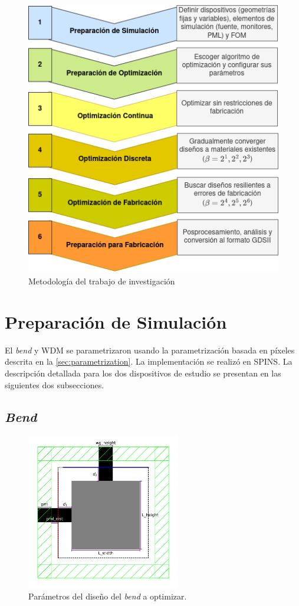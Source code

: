 \begin{figure}[ht]
  \centering
  \includegraphics[scale=0.8]{image/proposal/pipeline.png}
  \caption{Metodología del trabajo de investigación}
  \label{fig:pipeline}
\end{figure}

\section{Preparación de Simulación}\label{sec:preparar-simulacion}

El \emph{bend} y WDM se parametrizaron usando la parametrización basada en píxeles descrita en la
\autoref{sec:parametrization}.
La implementación se realizó en SPINS.
La descripción detallada para los dos dispositivos de estudio se presentan en las siguientes dos subsecciones.

\subsection{\emph{Bend}}

\begin{figure}[ht]
  \centering
  \includegraphics[width=0.6\textwidth]{image/proposal/bend.png}
  \caption{Parámetros del diseño del \emph{bend} a optimizar.}
  \label{fig:dimensiones-bend}
\end{figure}

